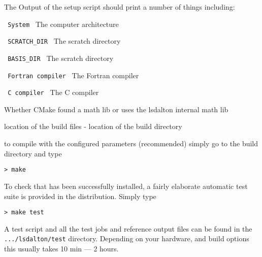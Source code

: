 The Output of the setup script should print a number of things including:
\begin{description}
\item \verb| System |  The computer architecture
\item \verb| SCRATCH_DIR |  The scratch directory
\item \verb| BASIS_DIR |  The scratch directory
\item \verb| Fortran compiler |  The Fortran compiler
\item \verb| C compiler |  The C compiler
\item Whether CMake found a math lib or uses the lsdalton internal math lib 
\item location of the build files - location of the build directory
\end{description}

to compile with the configured parameters (recommended) simply go to the 
build directory and type 
\begin{verbatim}
> make
\end{verbatim}

To check that {\lsdalton} has been successfully installed, a fairly
elaborate automatic test suite is provided in the distribution. Simply type
\begin{verbatim}
> make test
\end{verbatim}
A test script and all the test jobs and reference output files can be found in
the \verb|.../lsdalton/test| directory. 
Depending on your hardware, and build options this usually takes 10 min --- 2 hours.

